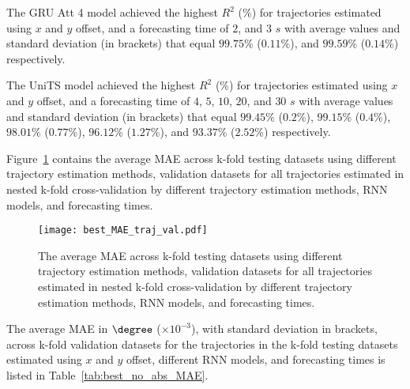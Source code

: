 The GRU Att 4 model achieved the highest $R^{2}$ (\%) for trajectories estimated using $x$ and $y$ offset, and a forecasting time of $2$, and $3$ $s$ with average values and standard deviation (in brackets) that equal $99.75$\% ($0.11$\%), and $99.59$\% ($0.14$\%) respectively.

The UniTS model achieved the highest $R^{2}$ (\%) for trajectories estimated using $x$ and $y$ offset, and a forecasting time of $4$, $5$, $10$, $20$, and $30$ $s$ with average values and standard deviation (in brackets) that equal $99.45$\% ($0.2$\%), $99.15$\% ($0.4$\%), $98.01$\% ($0.77$\%), $96.12$\% ($1.27$\%), and $93.37$\% ($2.52$\%) respectively.

Figure~\ref{fig:best_MAE_traj_val} contains the average MAE across k-fold testing datasets using different trajectory estimation methods, validation datasets for all trajectories estimated in nested k-fold cross-validation by different trajectory estimation methods, RNN models, and forecasting times.

\begin{figure}[!ht]
	\centering
	\texttt{[image: best\_MAE\_traj\_val.pdf]}
	\caption{The average MAE across k-fold testing datasets using different trajectory estimation methods, validation datasets for all trajectories estimated in nested k-fold cross-validation by different trajectory estimation methods, RNN models, and forecasting times.}
	\label{fig:best_MAE_traj_val}
\end{figure}

The average MAE in $\degree$ ($\times 10^{-3}$), with standard deviation in brackets, across k-fold validation datasets for the trajectories in the k-fold testing datasets estimated using $x$ and $y$ offset, different RNN models, and forecasting times is listed in Table~\ref{tab:best_no_abs_MAE}.

